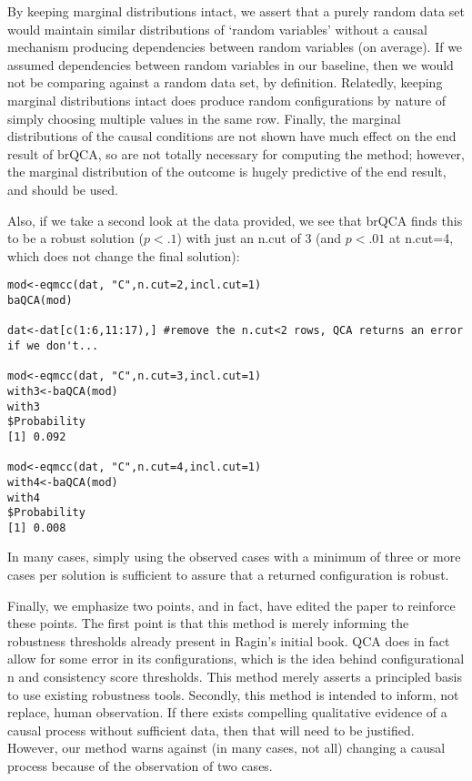 \documentclass[12pt,stdletter,dateno,sigleft]{newlfm} %
\begin{document}
\begin{newlfm}

By keeping marginal distributions intact, we assert that a purely random data set would maintain similar distributions of `random variables' without a causal mechanism producing dependencies between random variables (on average). If we assumed dependencies between random variables in our baseline, then we would not be comparing against a random data set, by definition. Relatedly, keeping marginal distributions intact does produce random configurations by nature of simply choosing multiple values in the same row. Finally, the marginal distributions of the causal conditions are not shown have much effect on the end result of brQCA, so are not totally necessary for computing the method; however, the marginal distribution of the outcome is hugely predictive of the end result, and should be used. 

Also, if we take a second look at the data provided, we see that brQCA finds this to be a robust solution ($p < .1$) with just an n.cut of 3 (and $p < .01$ at n.cut=4, which does not change the final solution):

 \newpage
 
\begin{verbatim}
mod<-eqmcc(dat, "C",n.cut=2,incl.cut=1)
baQCA(mod)

dat<-dat[c(1:6,11:17),] #remove the n.cut<2 rows, QCA returns an error if we don't...

mod<-eqmcc(dat, "C",n.cut=3,incl.cut=1)
with3<-baQCA(mod)
with3
$Probability
[1] 0.092

mod<-eqmcc(dat, "C",n.cut=4,incl.cut=1)
with4<-baQCA(mod)
with4
$Probability
[1] 0.008

\end{verbatim} 

In many cases, simply using the observed cases with a minimum of three or more cases per solution is sufficient to assure that a returned configuration is robust. 

Finally, we emphasize two points, and in fact, have edited the paper to reinforce these points. The first point is that this method is merely informing the robustness thresholds already present in Ragin's initial book. QCA does in fact allow for some error in its configurations, which is the idea behind configurational n and consistency score thresholds. This method merely asserts a principled basis to use existing robustness tools.  Secondly, this method is intended to inform, not replace, human observation. If there exists compelling qualitative evidence of a causal process without sufficient data, then that will need to be justified. However, our method warns against (in many cases, not all) changing a causal process because of the observation of two cases.



\end{newlfm}
\end{document}
